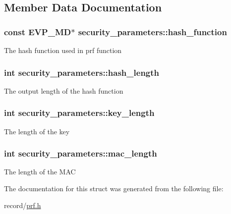 \subsection{Member Data Documentation}
\hypertarget{structsecurity__parameters_ac02e6339a98944f8e2a6568b6fb8ba80}{
\subsubsection[{hash\-\_\-function}]{\setlength{\rightskip}{0pt plus 5cm}const E\-V\-P\-\_\-\-M\-D$\ast$ security\-\_\-parameters\-::hash\-\_\-function}}\label{structsecurity__parameters_ac02e6339a98944f8e2a6568b6fb8ba80}
The hash function used in prf function \hypertarget{structsecurity__parameters_af58c14182cabb1e46a9ddd61f0bc275f}{
\subsubsection[{hash\-\_\-length}]{\setlength{\rightskip}{0pt plus 5cm}int security\-\_\-parameters\-::hash\-\_\-length}}\label{structsecurity__parameters_af58c14182cabb1e46a9ddd61f0bc275f}
The output length of the hash function \hypertarget{structsecurity__parameters_a29b3227de735a7c1e0d0083a75746015}{
\subsubsection[{key\-\_\-length}]{\setlength{\rightskip}{0pt plus 5cm}int security\-\_\-parameters\-::key\-\_\-length}}\label{structsecurity__parameters_a29b3227de735a7c1e0d0083a75746015}
The length of the key \hypertarget{structsecurity__parameters_ae14edd76dec6b2c7b9a427b892e275d0}{
\subsubsection[{mac\-\_\-length}]{\setlength{\rightskip}{0pt plus 5cm}int security\-\_\-parameters\-::mac\-\_\-length}}\label{structsecurity__parameters_ae14edd76dec6b2c7b9a427b892e275d0}
The length of the M\-A\-C 

The documentation for this struct was generated from the following file\-:\begin{DoxyCompactItemize}
\item 
record/\hyperlink{prf_8h}{prf.\-h}\end{DoxyCompactItemize}
